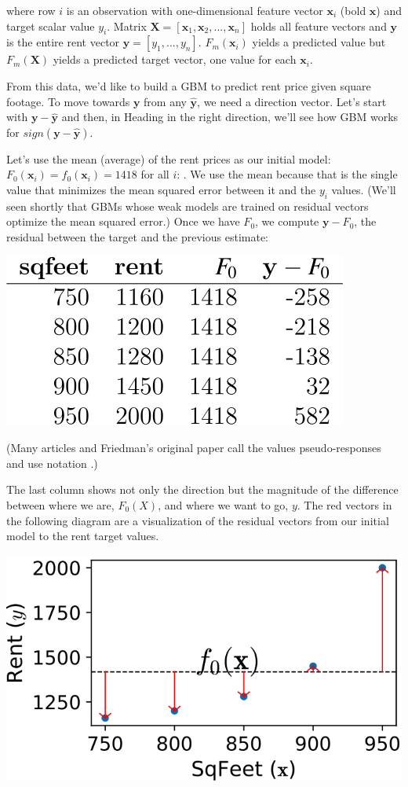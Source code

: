 \documentclass[]{book}
\theoremstyle{definition}
\theoremstyle{definition}
\theoremstyle{definition}
\theoremstyle{remark}
\begin{document}
where row \(i\) is an observation with one-dimensional feature vector
\(\mathbf x_i\) (bold \(\mathbf x\)) and target scalar value \(y_i\).
Matrix \(\mathbf X = [\mathbf x_1, \mathbf x_2, ..., \mathbf x_n]\)
holds all feature vectors and \(\mathbf y\) is the entire rent vector
\(\mathbf y = [y_1, ..., y_n]\). \(F_m(\mathbf x_i)\) yields a predicted
value but \(F_m(\mathbf X)\) yields a predicted target vector, one value
for each \(\mathbf x_i\).

From this data, we'd like to build a GBM to predict rent price given
square footage. To move towards \(\mathbf y\) from any
\(\hat{\mathbf y}\), we need a direction vector. Let's start with
\(\mathbf y - \hat{\mathbf y}\) and then, in Heading in the right
direction, we'll see how GBM works for
\(sign(\mathbf y - \hat{\mathbf y})\).

Let's use the mean (average) of the rent prices as our initial model:
\(F_0(\mathbf x_i) = f_0(\mathbf x_i) = 1418\) for all \(i\): . We use
the mean because that is the single value that minimizes the mean
squared error between it and the \(y_i\) values. (We'll seen shortly
that GBMs whose weak models are trained on residual vectors optimize the
mean squared error.) Once we have \(F_0\), we compute
\(\mathbf y - F_0\), the residual between the target and the previous
estimate:

\includegraphics{figures/latex-1.svg}

(Many articles and Friedman's original paper call the values
pseudo-responses and use notation .)

The last column shows not only the direction but the magnitude of the
difference between where we are, \(F_0(X)\), and where we want to go,
\(y\). The red vectors in the following diagram are a visualization of
the residual vectors from our initial model to the rent target values.

\includegraphics{figures/L2-loss_examples_3.svg}
\end{document}
